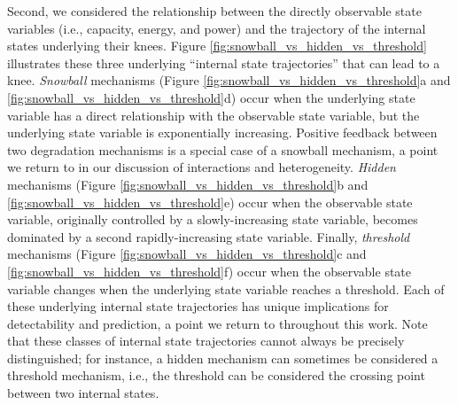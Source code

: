 \documentclass[journal=jpclcd,manuscript=article]{achemso}
\begin{document}
Second, we considered the relationship between the directly observable state variables (i.e., capacity, energy, and power) and the trajectory of the internal states underlying their knees. Figure \ref{fig:snowball_vs_hidden_vs_threshold} illustrates these three underlying ``internal state trajectories'' that can lead to a knee. \textit{Snowball} mechanisms (Figure \ref{fig:snowball_vs_hidden_vs_threshold}a and \ref{fig:snowball_vs_hidden_vs_threshold}d) occur when the underlying state variable has a direct relationship with the observable state variable, but the underlying state variable is exponentially increasing.
Positive feedback between two degradation mechanisms is a special case of a snowball mechanism, a point we return to in our discussion of interactions and heterogeneity.
\textit{Hidden} mechanisms (Figure \ref{fig:snowball_vs_hidden_vs_threshold}b and \ref{fig:snowball_vs_hidden_vs_threshold}e) occur when the observable state variable, originally controlled by a slowly-increasing state variable, becomes dominated by a second rapidly-increasing state variable. Finally, \textit{threshold} mechanisms (Figure \ref{fig:snowball_vs_hidden_vs_threshold}c and \ref{fig:snowball_vs_hidden_vs_threshold}f) occur when the observable state variable changes when the underlying state variable reaches a threshold. Each of these underlying internal state trajectories has unique implications for detectability and prediction, a point we return to throughout this work. Note that these classes of internal state trajectories cannot always be precisely distinguished; for instance, a hidden mechanism can sometimes be considered a threshold mechanism, i.e., the threshold can be considered the crossing point between two internal states.
\end{document}
